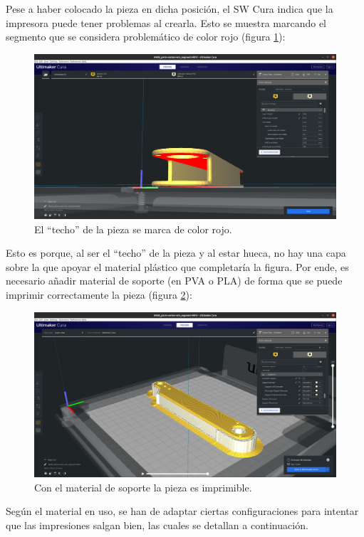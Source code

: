 Pese a haber colocado la pieza en dicha posición, el \ac{SW} Cura indica que la impresora
puede tener problemas al crearla. Esto se muestra marcando el segmento que se considera
problemático de color rojo (figura \ref{fig:vpiece_err}):

\begin{figure}[H]
    \centering
    \includegraphics[width=.7\linewidth]{pictures/v_piece_err.png}
    \caption{El ``techo'' de la pieza se marca de color rojo.}
    \label{fig:vpiece_err}
\end{figure}

Esto es porque, al ser el ``techo'' de la pieza y al estar hueca, no hay una capa sobre
la que apoyar el material plástico que completaría la figura. Por ende, es necesario
añadir material de soporte (en \ac{PVA} o \ac{PLA}) de forma que se puede imprimir
correctamente la pieza (figura \ref{fig:vpiece_ok}):

\begin{figure}[H]
    \centering
    \includegraphics[width=.7\linewidth]{pictures/v_piece_ok.png}
    \caption{Con el material de soporte la pieza es imprimible.}
    \label{fig:vpiece_ok}
\end{figure}

Según el material en uso, se han de adaptar ciertas configuraciones para intentar que
las impresiones salgan bien, las cuales se detallan a continuación.